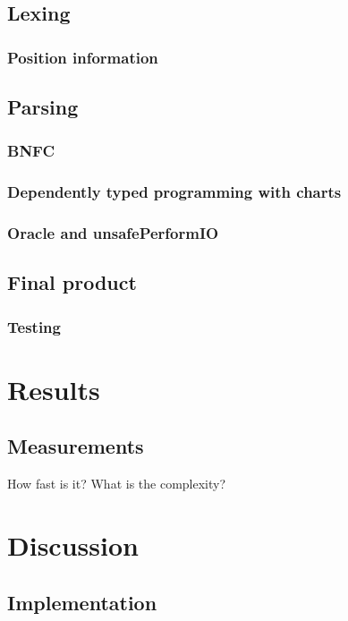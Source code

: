 \documentclass[a4paper,12pt,twosided]{report}
\begin{document}
\section{Lexing}
\subsection{Position information}

\section{Parsing}
\subsection{BNFC}
\subsection{Dependently typed programming with charts}
\subsection{Oracle and unsafePerformIO}


\section{Final product}
\subsection{Testing}

%
%

\chapter{Results}

\section{Measurements}
How fast is it? What is the complexity?

%
%
\chapter{Discussion}

\section{Implementation}
\end{document}
